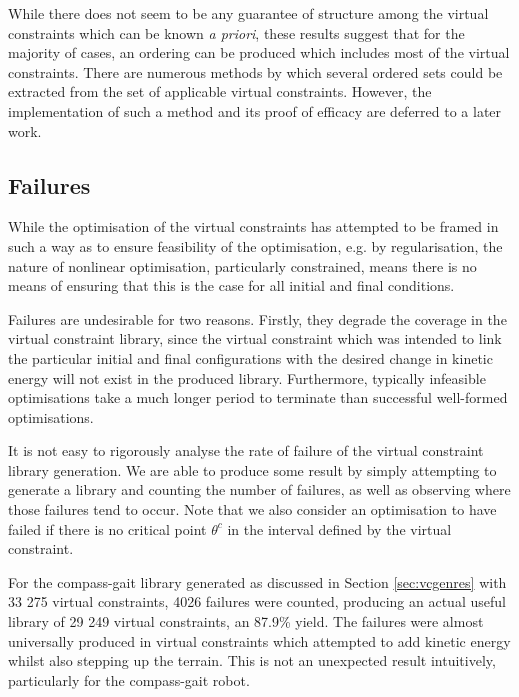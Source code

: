 While there does not seem to be any guarantee of structure among the virtual constraints which can be known \textit{a priori}, these results suggest that for the majority of cases, an ordering can be produced which includes most of the virtual constraints. There are numerous methods by which several ordered sets could be extracted from the set of applicable virtual constraints. However, the implementation of such a method and its proof of efficacy are deferred to a later work.

\subsection{Failures}
While the optimisation of the virtual constraints has attempted to be framed in such a way as to ensure feasibility of the optimisation, e.g. by regularisation, the nature of nonlinear optimisation, particularly constrained, means there is no means of ensuring that this is the case for all initial and final conditions.

Failures are undesirable for two reasons. Firstly, they degrade the coverage in the virtual constraint library, since the virtual constraint which was intended to link the particular initial and final configurations with the desired change in kinetic energy will not exist in the produced library. Furthermore, typically infeasible optimisations take a much longer period to terminate than successful well-formed optimisations.

It is not easy to rigorously analyse the rate of failure of the virtual constraint library generation. We are able to produce some result by simply attempting to generate a library and counting the number of failures, as well as observing where those failures tend to occur. Note that we also consider an optimisation to have failed if there is no critical point $\theta^c$ in the interval defined by the virtual constraint.

For the compass-gait library generated as discussed in Section \ref{sec:vcgenres} with 33 275 virtual constraints, 4026 failures were counted, producing an actual useful library of 29 249 virtual constraints, an 87.9\% yield. The failures were almost universally produced in virtual constraints which attempted to add kinetic energy whilst also stepping up the terrain. This is not an unexpected result intuitively, particularly for the compass-gait robot.